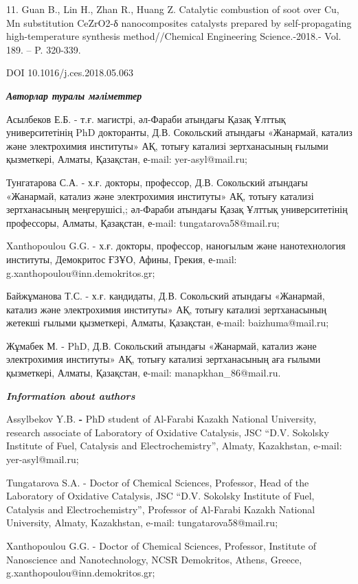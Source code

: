 11. Guan B., Lin H., Zhan R., Huang Z. Catalytic combustion of soot over
Cu, Mn substitution CeZrO2-δ nanocomposites catalysts prepared by
self-propagating high-temperature synthesis method//Chemical Engineering
Science.-2018.- Vol. 189. -- P. 320-339.

DOI 10.1016/j.ces.2018.05.063

\emph{{\bfseries Авторлар туралы мәліметтер}}

Асылбеков Е.Б. - т.ғ. магистрі, әл-Фараби атындағы Қазақ Ұлттық
университетінің PhD докторанты, Д.В. Сокольский атындағы «Жанармай,
катализ және электрохимия институты» АҚ, тотығу катализі зертханасының
ғылыми қызметкері, Алматы, Қазақстан, е-mail: yer-asyl@mail.ru;

Тунгатарова С.А. - х.ғ. докторы, профессор, Д.В. Сокольский атындағы
«Жанармай, катализ және электрохимия институты» АҚ, тотығу катализі
зертханасының меңгерушісі,; әл-Фараби атындағы Қазақ Ұлттық
университетінің профессоры, Алматы, Қазақстан, е-mail:
tungatarova58@mail.ru;

Xanthopoulou G.G. - х.ғ. докторы, профессор, наноғылым және
нанотехнология институты, Демокритос ҒЗҰО, Афины, Грекия, е-mail:
g.xanthopoulou@inn.demokritos.gr;

Байжұманова Т.С. - х.ғ. кандидаты, Д.В. Сокольский атындағы «Жанармай,
катализ және электрохимия институты» АҚ, тотығу катализі зертханасының
жетекші ғылыми қызметкері, Алматы, Қазақстан, е-mail: baizhuma@mail.ru;

Жұмабек М. - PhD, Д.В. Сокольский атындағы «Жанармай, катализ және
электрохимия институты» АҚ, тотығу катализі зертханасының аға ғылыми
қызметкері, Алматы, Қазақстан, е-mail: manapkhan\_86@mail.ru.

\emph{{\bfseries Information about authors}}

Assylbekov Y.B. {\bfseries -} PhD student of Al-Farabi Kazakh National
University, research associate of Laboratory of Oxidative Catalysis, JSC
``D.V. Sokolsky Institute of Fuel, Catalysis and Electrochemistry'',
Almaty, Kazakhstan, e-mail: yer-asyl@mail.ru;

Tungatarova S.A. - Doctor of Chemical Sciences, Professor, Head of the
Laboratory of Oxidative Catalysis, JSC ``D.V. Sokolsky Institute of
Fuel, Catalysis and Electrochemistry'', Professor of Al-Farabi Kazakh
National University, Almaty, Kazakhstan, e-mail: tungatarova58@mail.ru;

Xanthopoulou G.G. - Doctor of Chemical Sciences, Professor, Institute of
Nanoscience and Nanotechnology, NCSR Demokritos, Athens, Greece,
g.xanthopoulou@inn.demokritos.gr;

